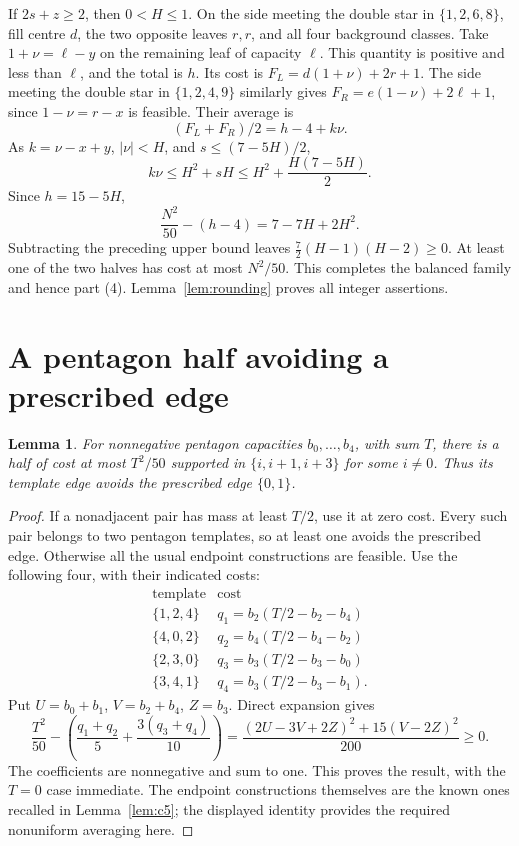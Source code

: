 \documentclass[11pt]{article}
\newtheorem{lemma}[theorem]{Lemma}
\begin{document}
If $2s+z\geq2$, then $0<H\leq1$.
On the side meeting the double star in $\{1,2,6,8\}$, fill centre $d$,
the two opposite leaves $r,r$, and all four background classes.
Take $1+\nu=\ell-y$ on the remaining leaf of capacity $\ell$.
This quantity is positive and less than $\ell$, and the total is $h$.
Its cost is $F_L=d(1+\nu)+2r+1$.
The side meeting the double star in $\{1,2,4,9\}$ similarly gives
$F_R=e(1-\nu)+2\ell+1$, since $1-\nu=r-x$ is feasible.
Their average is
\[
 (F_L+F_R)/2=h-4+k\nu .
\]
As $k=\nu-x+y$, $|\nu|<H$, and $s\leq(7-5H)/2$,
\[
 k\nu\leq H^2+sH\leq H^2+\frac{H(7-5H)}2 .
\]
Since $h=15-5H$,
\[
 \frac{N^2}{50}-(h-4)=7-7H+2H^2 .
\]
Subtracting the preceding upper bound leaves
$\tfrac72(H-1)(H-2)\geq0$.
At least one of the two halves has cost at most $N^2/50$.
This completes the balanced family and hence part (4).
Lemma~\ref{lem:rounding} proves all integer assertions.

\section{A pentagon half avoiding a prescribed edge}
\begin{lemma}\label{lem:avoid}
For nonnegative pentagon capacities $b_0,\ldots,b_4$, with sum $T$,
there is a half of cost at most $T^2/50$ supported in
$\{i,i+1,i+3\}$ for some $i\ne0$.
Thus its template edge avoids the prescribed edge $\{0,1\}$.
\end{lemma}
\begin{proof}
If a nonadjacent pair has mass at least $T/2$, use it at zero cost.
Every such pair belongs to two pentagon templates, so at least one
avoids the prescribed edge.
Otherwise all the usual endpoint constructions are feasible.
Use the following four, with their indicated costs:
\[
\begin{array}{c|c}
\text{template}&\text{cost}\\
\{1,2,4\}&q_1=b_2(T/2-b_2-b_4)\\
\{4,0,2\}&q_2=b_4(T/2-b_4-b_2)\\
\{2,3,0\}&q_3=b_3(T/2-b_3-b_0)\\
\{3,4,1\}&q_4=b_3(T/2-b_3-b_1).
\end{array}
\]
Put $U=b_0+b_1$, $V=b_2+b_4$, $Z=b_3$. Direct expansion gives
\[
 \frac{T^2}{50}
 -\left(\frac{q_1+q_2}{5}+\frac{3(q_3+q_4)}{10}\right)
 =\frac{(2U-3V+2Z)^2+15(V-2Z)^2}{200}\geq0 .
\]
The coefficients are nonnegative and sum to one.
This proves the result, with the $T=0$ case immediate.
The endpoint constructions themselves are the known ones recalled in
Lemma~\ref{lem:c5}; the displayed identity provides the required
nonuniform averaging here.
\end{proof}
\end{document}
